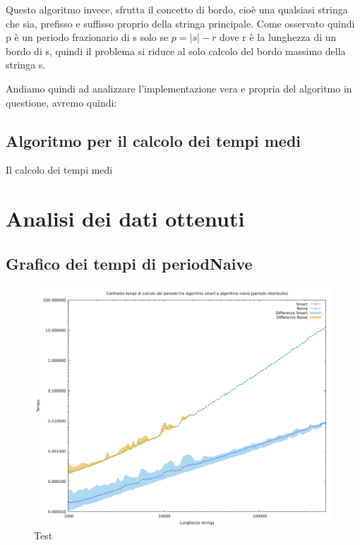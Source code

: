 \documentclass[a4paper,titlepage]{article}
\begin{document}
Questo algoritmo invece, sfrutta il concetto di bordo, cioè una qualsiasi stringa che sia, prefisso e suffisso proprio della stringa principale.
Come osservato quindi p è un periodo frazionario di s solo se \(p = |s| - r\) dove r è la lunghezza di un bordo di s, quindi il problema si riduce al solo calcolo del bordo massimo della stringa s.

Andiamo quindi ad analizzare l’implementazione vera e propria del algoritmo in questione, avremo quindi:

\subsection{Algoritmo per il calcolo dei tempi medi}

Il calcolo dei tempi medi

\section{Analisi dei dati ottenuti}

\subsection{Grafico dei tempi di periodNaive}

\begin{figure}[h]
                \centering
                \includegraphics[width=\columnwidth]{test}
                \caption{Test}
                \label{fig:graph2}
\end{figure}
\end{document}
